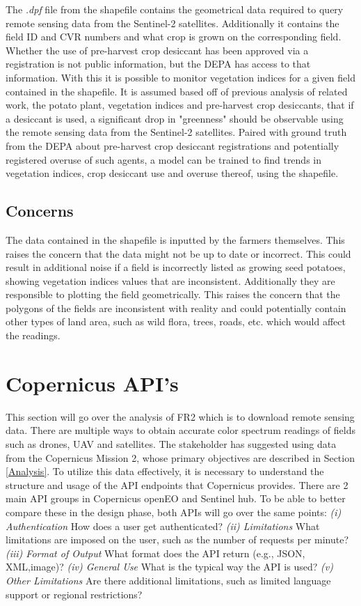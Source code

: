 The \textit{.dpf} file from the shapefile contains the geometrical data required to query remote sensing data from the Sentinel-2 satellites. Additionally it contains the field ID and CVR numbers and what crop is grown on the corresponding field. Whether the use of pre-harvest crop desiccant has been approved via a registration is not public information, but the \acrshort{DEPA} has access to that information. With this it is possible to monitor vegetation indices for a given field contained in the shapefile. It is assumed based off of previous analysis of related work, the potato plant, vegetation indices and pre-harvest crop desiccants, that if a desiccant is used, a significant drop in "greenness" should be observable using the remote sensing data from the Sentinel-2 satellites. Paired with ground truth from the \acrshort{DEPA} about pre-harvest crop desiccant registrations and potentially registered overuse of such agents, a model can be trained to find trends in vegetation indices, crop desiccant use and overuse thereof, using the shapefile. 

\subsection{Concerns}
The data contained in the shapefile is inputted by the farmers themselves. This raises the concern that the data might not be up to date or incorrect. This could result in additional noise if a field is incorrectly listed as growing seed potatoes, showing vegetation indices values that are inconsistent. Additionally they are responsible to plotting the field geometrically. This raises the concern that the polygons of the fields are inconsistent with reality and could potentially contain other types of land area, such as wild flora, trees, roads, etc. which would affect the readings.

\section{Copernicus API's}
\label{Sec:Copernicus API}
This section will go over the analysis of FR2 which is to download remote sensing data.
There are multiple ways to obtain accurate color spectrum readings of fields such as drones, UAV and satellites. The stakeholder has suggested using data from the Copernicus Mission 2, whose primary objectives are described in Section \ref{Analysis}. To utilize this data effectively, it is necessary to understand the structure and usage of the API endpoints that Copernicus provides.
There are 2 main API groups in Copernicus openEO and Sentinel hub.
To be able to better compare these in the design phase, both APIs will go over the same points:
\textit{(i) Authentication} How does a user get authenticated?
\textit{(ii) Limitations} What limitations are imposed on the user, such as the number of requests per minute?
\textit{(iii) Format of Output} What format does the API return (e.g., JSON, XML,image)?
\textit{(iv) General Use} What is the typical way the API is used?
\textit{(v) Other Limitations} Are there additional limitations, such as limited language support or regional restrictions?

